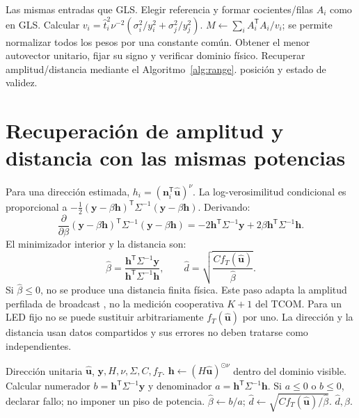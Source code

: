 \documentclass[11pt,a4paper]{article}
\begin{document}
\begin{algorithm}[htbp]\caption{WLS adaptado al receptor}\begin{algorithmic}[1]
\Require Las mismas entradas que GLS.
\State Elegir referencia y formar cocientes/filas $A_i$ como en GLS.
\State Calcular $v_i=\hat t_i^2\nu^{-2}(\sigma_i^2/y_i^2+\sigma_j^2/y_j^2)$.
\State $M\gets\sum_i A_i^{\mathsf T}A_i/v_i$; se permite normalizar todos los pesos por una constante común.
\State Obtener el menor autovector unitario, fijar su signo y verificar dominio físico.
\State Recuperar amplitud/distancia mediante el Algoritmo~\ref{alg:range}.
\State \Return posición y estado de validez.
\end{algorithmic}\end{algorithm}

\section{Recuperación de amplitud y distancia con las mismas potencias}
Para una dirección estimada, $h_i=(\mathbf n_i^{\mathsf T}\hat{\mathbf u})^\nu$. La log-verosimilitud condicional es proporcional a $-\tfrac12(\mathbf y-\beta\mathbf h)^{\mathsf T}\Sigma^{-1}(\mathbf y-\beta\mathbf h)$. Derivando:
\begin{equation}
 \frac{\partial}{\partial\beta}(\mathbf y-\beta\mathbf h)^{\mathsf T}\Sigma^{-1}(\mathbf y-\beta\mathbf h)
 =-2\mathbf h^{\mathsf T}\Sigma^{-1}\mathbf y+2\beta\mathbf h^{\mathsf T}\Sigma^{-1}\mathbf h.
\end{equation}
El minimizador interior y la distancia son:
\begin{equation}
 \hat\beta=\frac{\mathbf h^{\mathsf T}\Sigma^{-1}\mathbf y}{\mathbf h^{\mathsf T}\Sigma^{-1}\mathbf h},\qquad
 \hat d=\sqrt{\frac{Cf_T(\hat{\mathbf u})}{\hat\beta}}.
\label{eq:range}
\end{equation}
Si $\hat\beta\leq0$, no se produce una distancia finita física. Este paso adapta la amplitud perfilada de broadcast \cite{broadcast}, no la medición cooperativa $K+1$ del TCOM. Para un LED fijo no se puede sustituir arbitrariamente $f_T(\hat{\mathbf u})$ por uno. La dirección y la distancia usan datos compartidos y sus errores no deben tratarse como independientes.

\begin{algorithm}[htbp]\caption{Amplitud perfilada y distancia dual}\label{alg:range}\begin{algorithmic}[1]
\Require Dirección unitaria $\hat{\mathbf u}$, $\mathbf y,H,\nu,\Sigma,C,f_T$.
\State $\mathbf h\gets(H\hat{\mathbf u})^{\odot\nu}$ dentro del dominio visible.
\State Calcular numerador $b=\mathbf h^{\mathsf T}\Sigma^{-1}\mathbf y$ y denominador $a=\mathbf h^{\mathsf T}\Sigma^{-1}\mathbf h$.
\State Si $a\leq0$ o $b\leq0$, declarar fallo; no imponer un piso de potencia.
\State $\hat\beta\gets b/a$; $\hat d\gets\sqrt{Cf_T(\hat{\mathbf u})/\hat\beta}$.
\State \Return $\hat d,\hat\beta$.
\end{algorithmic}\end{algorithm}
\end{document}
